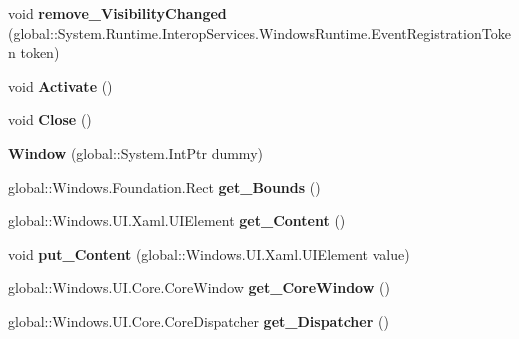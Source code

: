 \begin{DoxyCompactItemize}
void {\bfseries remove\+\_\+\+Visibility\+Changed} (global\+::\+System.\+Runtime.\+Interop\+Services.\+Windows\+Runtime.\+Event\+Registration\+Token token)
\item 
\mbox{\label{class_windows_1_1_u_i_1_1_xaml_1_1_window_a92d7288cb5bc807e56222e347e2e7603}} 
void {\bfseries Activate} ()
\item 
\mbox{\label{class_windows_1_1_u_i_1_1_xaml_1_1_window_ab6b6a8e512a08f5ba35b8bc367dfeea8}} 
void {\bfseries Close} ()
\item 
\mbox{\label{class_windows_1_1_u_i_1_1_xaml_1_1_window_a2f884c667c9bd45a983c8611d71c365b}} 
{\bfseries Window} (global\+::\+System.\+Int\+Ptr dummy)
\item 
\mbox{\label{class_windows_1_1_u_i_1_1_xaml_1_1_window_a3b4023c9ffd4210037266cde25034d90}} 
global\+::\+Windows.\+Foundation.\+Rect {\bfseries get\+\_\+\+Bounds} ()
\item 
\mbox{\label{class_windows_1_1_u_i_1_1_xaml_1_1_window_ae8eec75ce505d25ba6c2553adc1784b5}} 
global\+::\+Windows.\+U\+I.\+Xaml.\+U\+I\+Element {\bfseries get\+\_\+\+Content} ()
\item 
\mbox{\label{class_windows_1_1_u_i_1_1_xaml_1_1_window_ad4e7eb6e2bbbcc9db175cc0467fa6060}} 
void {\bfseries put\+\_\+\+Content} (global\+::\+Windows.\+U\+I.\+Xaml.\+U\+I\+Element value)
\item 
\mbox{\label{class_windows_1_1_u_i_1_1_xaml_1_1_window_a4ea24c3c21a169c23a2ae6ca99188f43}} 
global\+::\+Windows.\+U\+I.\+Core.\+Core\+Window {\bfseries get\+\_\+\+Core\+Window} ()
\item 
\mbox{\label{class_windows_1_1_u_i_1_1_xaml_1_1_window_a209f50e7cf5593a7150291903f99e541}} 
global\+::\+Windows.\+U\+I.\+Core.\+Core\+Dispatcher {\bfseries get\+\_\+\+Dispatcher} ()
\item 
\mbox{\label{class_windows_1_1_u_i_1_1_xaml_1_1_window_a9c86b88ed3cf1a52a88a638b75e01fa7}} 

\end{DoxyCompactItemize}
